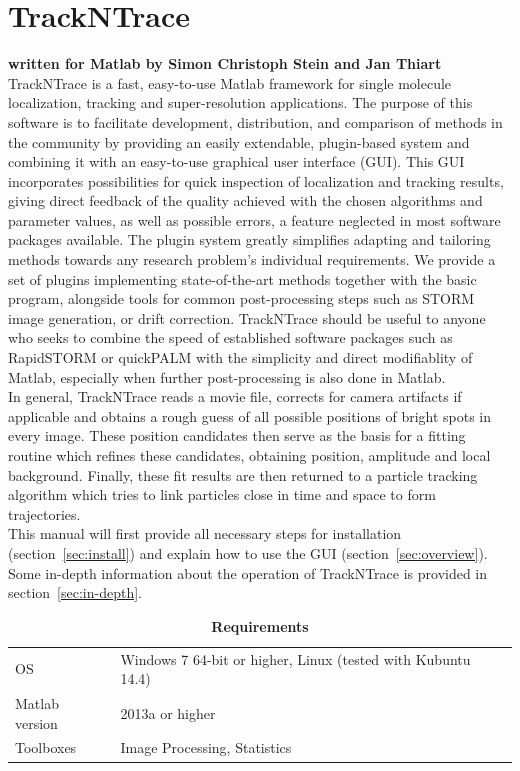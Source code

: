 \documentclass[11pt,onside]{report}
\numberwithin{equation}{chapter}
\begin{document}
\chapter*{TrackNTrace}
\vspace*{-30pt}\textbf{written for Matlab by Simon Christoph Stein and Jan Thiart}\\ [20pt]
TrackNTrace is a fast, easy-to-use Matlab framework for single molecule localization, tracking and super-resolution applications. The purpose of this software is to facilitate development, distribution, and comparison of methods in the community by providing an easily extendable, plugin-based system and combining it with an easy-to-use graphical user interface (GUI). This GUI incorporates possibilities for quick inspection of localization and tracking results, giving direct feedback of the quality achieved with the chosen algorithms and parameter values, as well as possible errors, a feature neglected in most software packages available. The plugin system greatly simplifies adapting and tailoring methods towards any research problem's individual requirements. We provide a set of plugins implementing state-of-the-art methods together with the basic program, alongside tools for common post-processing steps such as STORM image generation, or drift correction. TrackNTrace should be useful to anyone who seeks to combine the speed of established software packages such as RapidSTORM or quickPALM with the simplicity and direct modifiablity of Matlab, especially when further post-processing is also done in Matlab.\\
  
In general, TrackNTrace reads a movie file, corrects for camera artifacts if applicable and obtains a rough guess of all possible positions of bright spots in every image. These position candidates then serve as the basis for a fitting routine which refines these candidates, obtaining position, amplitude and local background. Finally, these fit results are then returned to a particle tracking algorithm which tries to link particles close in time and space to form trajectories.\\[10pt]
This manual will first provide all necessary steps for installation (section~\ref{sec:install}) and explain how to use the GUI (section~\ref{sec:overview}). Some in-depth information about the operation of TrackNTrace is provided in section~\ref{sec:in-depth}.
\begin{table}[!h]
\centering
\caption*{\textbf{Requirements}}
\label{tab:requirements}
\begin{tabular}{p{} p{}}
\toprule
OS & Windows 7 64-bit or higher, Linux (tested with Kubuntu 14.4) \\[5pt]
Matlab version & 2013a or higher\\[5pt]
Toolboxes & Image Processing, Statistics \\[0pt]
\bottomrule
\end{tabular}
\end{table}
\end{document}
